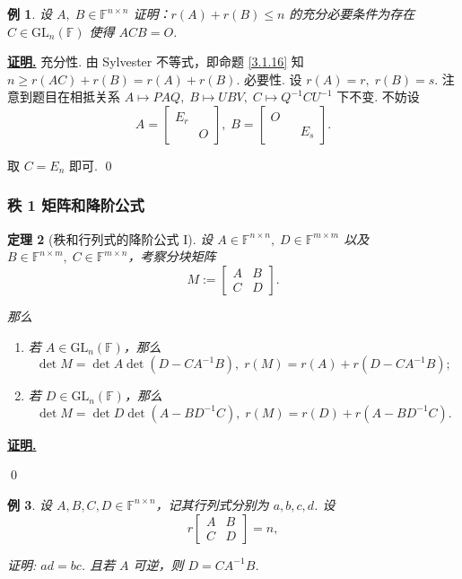 \documentclass[10pt,openany]{article}
\theoremstyle{thmstyle} %
\newtheorem{theorem}{定理}[subsection]
\theoremstyle{defstyle} %
\theoremstyle{prostyle} %
\theoremstyle{exastyle}
\newtheorem{example}[theorem]{例}
\theoremstyle{remstyle}
\renewenvironment{proof}[1][证明]{\par\underline{\textbf{#1.}} \;\fangsong}{\qed\par}
\newcommand{\F}{\mathbb{F}}
\newcommand{\gfn}{\text{GL}_n(\mathbb{F})}
\newcommand{\n}{^{n \times n}}
\newcommand{\mn}{^{m \times n}}
\newcommand{\nm}{^{n \times m}}
\begin{document}
\begin{example} \label{3.2.9}
	设 \( A, \; B \in \F\n \) 证明：\( r(A)+r(B) \leq n \) 的充分必要条件为存在 \( C \in \gfn \) 使得 \( ACB=O \).
\end{example}

\begin{proof}
	充分性. 由 Sylvester 不等式，即命题 \ref{3.1.16} 知 \( n \geq r(AC)+r(B)=r(A)+r(B) \). 必要性. 设 \( r(A)=r, \; r(B)=s \). 注意到题目在相抵关系 \( A \mapsto PAQ, \; B \mapsto UBV, \; C \mapsto Q^{-1}CU^{-1} \) 下不变. 不妨设 
	\[ A= \begin{bmatrix}
		E_r &  \\ & O 
	\end{bmatrix}, \; B=\begin{bmatrix}
	 O &  \\ & & E_s
	\end{bmatrix}.  \]
	
	取 \( C=E_n \) 即可.
\end{proof}




\subsubsection{秩 1 矩阵和降阶公式}

\begin{theorem}[秩和行列式的降阶公式 I]
	设 \( A \in \F\n, \; D \in \F^{m \times m} \) 以及 \( B \in \F\nm, \; C \in \F\mn \)，考察分块矩阵
	\[ M:=\begin{bmatrix}
		A & B \\ C & D
	\end{bmatrix}. \]
	
	那么
	\begin{enumerate}[(1)]
		\item 若 \( A \in \gfn \)，那么
		\[ \det M=\det A\det (D-CA^{-1}B), \; r(M)=r(A)+r(D-CA^{-1}B); \]
		\item 若 \( D \in \gfn \)，那么
		\[ \det M=\det D\det (A-BD^{-1}C), \; r(M)=r(D)+r(A-BD^{-1}C). \]
	\end{enumerate}
\end{theorem}

\begin{proof}
	
\end{proof}

\begin{example}
	设 \( A,B,C,D \in \F\n \)，记其行列式分别为 \( a,b,c,d \). 设
	\[ r\begin{bmatrix}
		A & B \\ C & D
	\end{bmatrix}=n, \]
	
	证明: \( ad=bc \). 且若 \( A \) 可逆，则 \( D=CA^{-1}B \).
\end{example}
\end{document}
